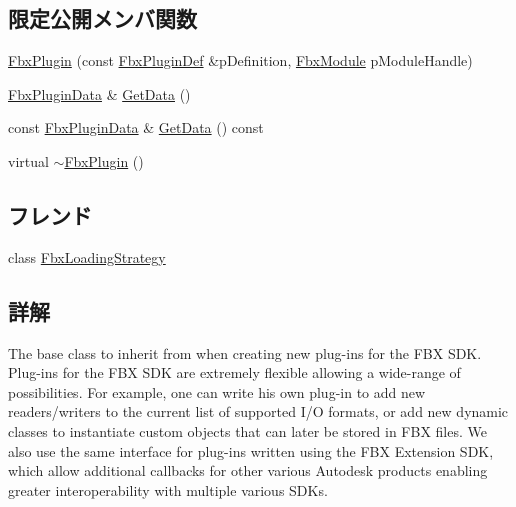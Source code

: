 \subsection*{限定公開メンバ関数}
\begin{DoxyCompactItemize}
\item 
\hyperlink{class_fbx_plugin_ab9ee11bcfcbc81e8fa9696f113e03181}{Fbx\+Plugin} (const \hyperlink{struct_fbx_plugin_def}{Fbx\+Plugin\+Def} \&p\+Definition, \hyperlink{fbxmodule_8h_a1d2ed3e9ccb8075d585f7cb7bdf40420}{Fbx\+Module} p\+Module\+Handle)
\item 
\hyperlink{struct_fbx_plugin_data}{Fbx\+Plugin\+Data} \& \hyperlink{class_fbx_plugin_a2bcee62f35bb9ccaf60dddaa2bd42ed9}{Get\+Data} ()
\item 
const \hyperlink{struct_fbx_plugin_data}{Fbx\+Plugin\+Data} \& \hyperlink{class_fbx_plugin_aa35c615aa2b4b740ae01e6301503c844}{Get\+Data} () const
\item 
virtual \hyperlink{class_fbx_plugin_ae1d45c36d20e8174fdfe3985a9e0e2d3}{$\sim$\+Fbx\+Plugin} ()
\end{DoxyCompactItemize}
\subsection*{フレンド}
\begin{DoxyCompactItemize}
\item 
class \hyperlink{class_fbx_plugin_a0e95beb1c4d5b2d326640c0ec8e9fbed}{Fbx\+Loading\+Strategy}
\end{DoxyCompactItemize}


\subsection{詳解}
The base class to inherit from when creating new plug-\/ins for the F\+BX S\+DK. Plug-\/ins for the F\+BX S\+DK are extremely flexible allowing a wide-\/range of possibilities. For example, one can write his own plug-\/in to add new readers/writers to the current list of supported I/O formats, or add new dynamic classes to instantiate custom objects that can later be stored in F\+BX files. We also use the same interface for plug-\/ins written using the F\+BX Extension S\+DK, which allow additional callbacks for other various Autodesk products enabling greater interoperability with multiple various S\+D\+Ks.

